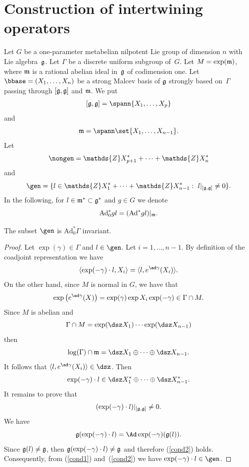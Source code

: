 \section{Construction of intertwining operators}\label{section5}

Let $G$ be a one-parameter metabelian nilpotent  Lie group  of
dimension $n$ with Lie algebra~$\frak g$.
 Let $\Gamma$ be a discrete uniform
subgroup of~$G$. Let $M = \exp(\frak m)$, where $\frak m$ is  a
rational abelian ideal in~$\frak g$ of codimension one.
 Let  $\bbase = (X_1, \ldots, X_n)$ be a
strong Malcev basis of $\frak g$ strongly based on~$\Gamma$ passing
through $[\frak g, \frak g]$ and $\frak m$. We put
\begin{gather}\label{alg-derivee}
[\frak g, \frak g] = \spann\lbrace X_1,\ldots, X_p\rbrace
\end{gather}
and
\[
\frak m
=\spann\set{X_1, \ldots, X_{n-1}}.
\]
  Let
\[
\nongen = \mathds{Z} X_{p+1}^*+\cdots+\mathds{Z}X_{n}^*
\]
and
\[
\gen= \{ l \in
\mathds{Z}X_1^*+\cdots +\mathds{Z}X_{n-1}^*:\ l\vert_{[\frak g,
\frak g]}\ne 0\}.
\]
 In the following, for $l \in \frak m^* \subset \frak g^*$ and $g
\in G$ we denote
\[
 \mathrm{Ad}_0^*g l =(\mathrm{Ad}^* g l)\vert_{\frak m}.
 \]


\begin{lemma}
 The subset $\gen$ is $  \mathrm{Ad}_0^* \Gamma$ invariant.
\end{lemma}
\begin{proof}
Let $\exp(\gamma) \in \Gamma$ and $l \in \gen$. Let $i=1, \ldots,
n-1$. By def\/inition of the coadjoint representation we have
\[
\langle \exp(-\gamma)\cdot l, X_i\rangle = \langle l, e^{\ad
\gamma}(X_i)\rangle.
\]
 On the other hand, since $M$ is normal in
$G$,  we have  that
\[
\exp\big(e^{\ad
\gamma}(X)\big) = \exp(\gamma) \exp{X_i} \exp(-\gamma) \in \Gamma \cap
M.
\] Since $M$ is abelian and
\[
\Gamma \cap M=\exp(\dsz X_1)\cdots
\exp(\dsz X_{n-1})
\] then
\[
\log(\Gamma) \cap \frak m=\dsz X_1\oplus\cdots\oplus \dsz
X_{n-1}.
\] It follows that  $\langle l, e^{\ad \gamma}(X_i)\rangle
\in \dsz$. Then
\begin{gather}\label{cond1}
\exp(-\gamma)\cdot l\in
\dsz X_1^*\oplus\cdots\oplus \dsz X_{n-1}^*.
\end{gather}
It remains to prove that
\begin{gather}\label{cond2}
(\exp(-\gamma)\cdot l)\vert_{[\frak g, \frak g]}\ne 0.
\end{gather}
We have
\[
\frak g(\exp(-\gamma)\cdot l)=\Ad\exp(-\gamma)(\frak g(l)).
\]
Since $\frak g(l)\ne \frak g$, then $\frak g(\exp(-\gamma)\cdot
l)\ne \frak g$ and therefore (\ref{cond2}) holds. Consequently, from
(\ref{cond1}) and~(\ref{cond2}) we have $\exp(-\gamma)\cdot l \in
\gen$.
\end{proof}



